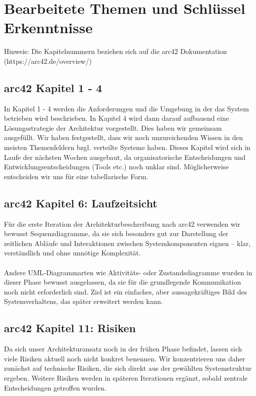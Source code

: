\documentclass{article}
\begin{document}


\section{Bearbeitete Themen und Schlüssel Erkenntnisse}
Hinweis: Die Kapitelnummern beziehen sich auf die arc42 Dokumentation (https://arc42.de/overview/)

\subsection{arc42 Kapitel 1 - 4}
In Kapitel 1 - 4 werden die Anforderungen und die Umgebung in der das System betrieben wird beschrieben. In Kapitel 4 wird dann darauf aufbauend eine Lösungsstrategie der Architektur vorgestellt. Dies haben wir gemeinsam ausgefüllt. Wir haben festgestellt, dass wir noch unzureichenden Wissen in den meisten Themenfeldern bzgl. verteilte Systeme haben. Dieses Kapitel wird sich in Laufe der nächsten Wochen ausgebaut, da organisatorische Entscheidungen und Entwicklungsentscheidungen (Tools etc.) noch unklar sind. Möglicherweise entscheiden wir uns für eine tabellarische Form.


\subsection{arc42 Kapitel 6: Laufzeitsicht}
Für die erste Iteration der Architekturbeschreibung nach arc42 verwenden wir bewusst Sequenzdiagramme, da sie sich besonders gut zur Darstellung der zeitlichen Abläufe und Interaktionen zwischen Systemkomponenten eignen – klar, verständlich und ohne unnötige Komplexität.\\\\
Andere UML-Diagrammarten wie Aktivitäts- oder Zustandsdiagramme wurden in dieser Phase bewusst ausgelassen, da sie für die grundlegende Kommunikation noch nicht erforderlich sind. Ziel ist ein einfaches, aber aussagekräftiges Bild des Systemverhaltens, das später erweitert werden kann.

\subsection{arc42 Kapitel 11: Risiken}
Da sich unser Architekturansatz noch in der frühen Phase befindet, lassen sich viele Risiken aktuell noch nicht konkret benennen.
Wir konzentrieren uns daher zunächst auf technische Risiken, die sich direkt aus der gewählten Systemstruktur ergeben. Weitere Risiken werden in späteren Iterationen ergänzt, sobald zentrale Entscheidungen getroffen wurden.
\end{document}
